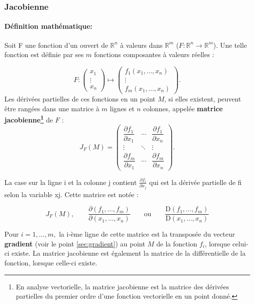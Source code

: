 

	
\subsubsection{Jacobienne}
\paragraph*{Définition mathématique:}
Soit F une fonction d'un ouvert de $\mathbb{R}^{n}$ à valeurs dans $\mathbb{R}^{m}$ ($F:\mathbb{R}^{n}\to \mathbb {R}^{m}$). Une telle fonction est définie par ses $m$ fonctions composantes à valeurs réelles :

$$ 
{ F:
	{\begin{pmatrix}
			x_{1}\\\vdots \\
			x_{n}
	\end{pmatrix}}
	\longmapsto 
	{\begin{pmatrix}
			f_{1}(x_{1},\dots ,x_{n})\\
			\vdots \\f_{m}(x_{1},\dots ,x_{n})
\end{pmatrix}}}.
$$
Les dérivées partielles de ces fonctions en un point $M$, si elles existent, peuvent être rangées dans une matrice à $m$ lignes et $n$ colonnes, appelée \textbf{matrice jacobienne\footnote{En analyse vectorielle, la matrice jacobienne est la matrice des dérivées partielles du premier ordre d'une fonction vectorielle en un point donné.}} de $F$ :
$$
J_{F}\left(M\right)={
	\begin{pmatrix}
		{\dfrac {\partial f_{1}}{\partial x_{1}}}&\cdots &{\dfrac {\partial f_{1}}{\partial x_{n}}}\\
		\vdots &\ddots &\vdots \\
		{\dfrac {\partial f_{m}}{\partial x_{1}}}&\cdots &{\dfrac {\partial f_{m}}{\partial x_{n}}}
\end{pmatrix}}.
$$

La case sur la ligne i et la colonne j contient ${\displaystyle {\frac {\partial f_{i}}{\partial x_{j}}}}$ qui est la dérivée partielle de fi selon la variable xj. Cette matrice est notée :

$${\displaystyle J_{F}\left(M\right),\qquad {\frac {\partial \left(f_{1},\ldots ,f_{m}\right)}{\partial \left(x_{1},\ldots ,x_{n}\right)}}\qquad {\text{ou}}\qquad {\frac {\mathrm {D} \left(f_{1},\ldots ,f_{m}\right)}{\mathrm {D} \left(x_{1},\ldots ,x_{n}\right)}}}$$

Pour $i = 1, … , m,$ la i-ème ligne de cette matrice est la transposée du vecteur \textbf{gradient} (voir le point \ref{sec:gradient}) au point $M$ de la fonction $f_i$, lorsque celui-ci existe. La matrice jacobienne est également la matrice de la différentielle de la fonction, lorsque celle-ci existe.
